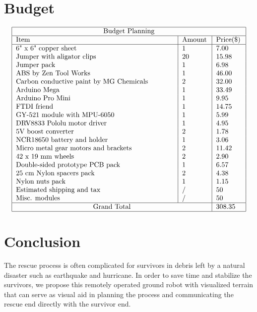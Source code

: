 \documentclass[a4paper,12pt]{article}
\begin{document}
\section{Budget}
$$
\begin{tabular}{ |p{8cm}|p{1.3cm}|p{1.3cm}|  }
	\hline
		\multicolumn{3}{|c|}{Budget Planning} \\
	\hline
		 Item & Amount & Price(\$) \\
	\hline
		 6" x 6" copper sheet									& 	1	&	7.00\\
		 Jumper with aligator clips								&	20	&	15.98\\
		 Jumper	pack												&	1	&	6.98\\
		 ABS by Zen Tool Works								&	1	&	46.00\\
		 Carbon conductive paint by MG Chemicals	&	2	&	32.00\\
		 Arduino Mega												&	1	&	33.49\\
		 Arduino Pro Mini											&	1	&	9.95\\
		 FTDI friend													&	1	&	14.75\\
		 GY-521 module with MPU-6050					&	1	&	5.99\\
		 DRV8833 Pololu motor driver						&	1	&	4.95\\
		 5V boost converter										&	2	&	1.78\\
		 NCR18650 battery and holder						&	1	&	3.06\\
		 Micro metal gear motors and brackets			&	2	&	11.42\\
		 42 x 19 mm wheels										&	2	&	2.90\\
		 Double-sided prototype PCB pack				&	1	&	6.57\\
		 25 cm Nylon spacers pack							&	2	&	4.38\\
		 Nylon nuts pack											&	1	&	1.15\\
		 Estimated shipping and tax							&	/	&	50\\
		 Misc. modules												& /	& 	50\\
	\hline
		\multicolumn{2}{|c|}{Grand Total}	& 308.35\\
	\hline
\end{tabular}
$$

\section{Conclusion}
\indent The rescue process is often complicated for survivors in debris left by a natural disaster such as earthquake and hurricane. In order to save time and stabilize the survivors, we propose this remotely operated ground robot with visualized terrain that can serve as visual aid in planning the process and communicating the rescue end directly with the survivor end.



\medskip



\end{document}

